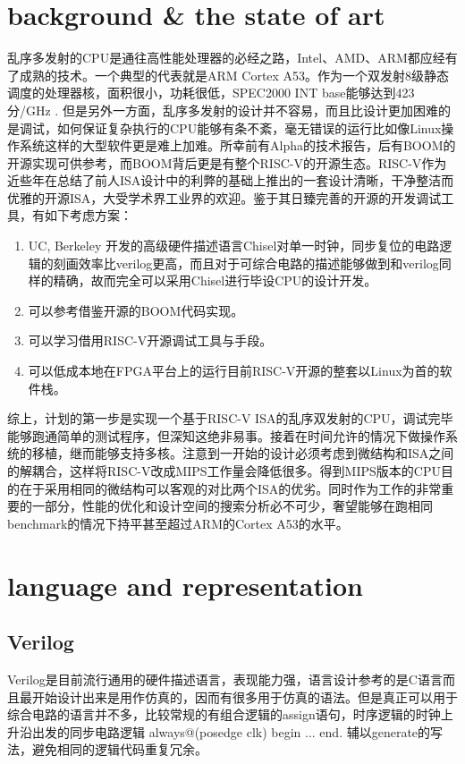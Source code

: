 \documentclass[twocolumn,10pt]{article}
\begin{document}
\section{background \& the state of art}
乱序多发射的CPU是通往高性能处理器的必经之路，Intel、AMD、ARM都应经有了成熟的技术。一个典型的代表就是ARM Cortex A53。作为一个双发射8级静态调度的处理器核，面积很小，功耗很低，SPEC2000 INT base能够达到423分/GHz%
. 但是另外一方面，乱序多发射的设计并不容易，而且比设计更加困难的是调试，如何保证复杂执行的CPU能够有条不紊，毫无错误的运行比如像Linux操作系统这样的大型软件更是难上加难。所幸前有Alpha的技术报告，后有BOOM的开源实现可供参考，而BOOM背后更是有整个RISC-V的开源生态。RISC-V作为近些年在总结了前人ISA设计中的利弊的基础上推出的一套设计清晰，干净整洁而优雅的开源ISA，大受学术界工业界的欢迎。鉴于其日臻完善的开源的开发调试工具，有如下考虑方案：
\begin{enumerate}
	\item UC, Berkeley 开发的高级硬件描述语言Chisel对单一时钟，同步复位的电路逻辑的刻画效率比verilog更高，而且对于可综合电路的描述能够做到和verilog同样的精确，故而完全可以采用Chisel进行毕设CPU的设计开发。
	\item 可以参考借鉴开源的BOOM代码实现。
	\item 可以学习借用RISC-V开源调试工具与手段。
	\item 可以低成本地在FPGA平台上的运行目前RISC-V开源的整套以Linux为首的软件栈。
\end{enumerate}

综上，计划的第一步是实现一个基于RISC-V ISA的乱序双发射的CPU，调试完毕能够跑通简单的测试程序，但深知这绝非易事。接着在时间允许的情况下做操作系统的移植，继而能够支持多核。注意到一开始的设计必须考虑到微结构和ISA之间的解耦合，这样将RISC-V改成MIPS工作量会降低很多。得到MIPS版本的CPU目的在于采用相同的微结构可以客观的对比两个ISA的优劣。同时作为工作的非常重要的一部分，性能的优化和设计空间的搜索分析必不可少，奢望能够在跑相同benchmark的情况下持平甚至超过ARM的Cortex A53的水平。

\section{language and representation}
\subsection{Verilog}
Verilog是目前流行通用的硬件描述语言，表现能力强，语言设计参考的是C语言而且最开始设计出来是用作仿真的，因而有很多用于仿真的语法。但是真正可以用于综合电路的语言并不多，比较常规的有组合逻辑的assign语句，时序逻辑的时钟上升沿出发的同步电路逻辑 always@(posedge clk) begin ... end. 辅以generate的写法，避免相同的逻辑代码重复冗余。
\end{document}
